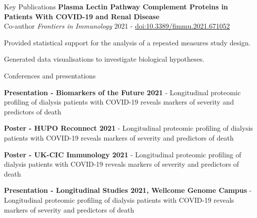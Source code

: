 \documentclass{resume}
\begin{document}
\begin{rSection}{Key Publications}
\textbf{Plasma Lectin Pathway Complement Proteins in Patients With COVID-19 and Renal Disease} \\
Co-author \hfill  \textit{Frontiers in Immunology} 2021 - \href{https://doi.org/10.3389/fimmu.2021.671052}{doi:10.3389/fimmu.2021.671052}

\vspace{2pt plus 1pt minus 1pt}
\item Provided statistical support for the analysis of a repeated measures study design.
\item Generated data visualisations to investigate biological hypotheses. \\

\end{rSection}

\begin{rSection}{Conferences and presentations}

\item \textbf{Presentation - Biomarkers of the Future 2021} - Longitudinal proteomic profiling of dialysis patients with COVID-19 reveals markers of severity and predictors of death
\vspace{2pt plus 1pt minus 1pt}

\item \textbf{Poster - HUPO Reconnect 2021} - Longitudinal proteomic profiling of dialysis patients with COVID-19 reveals markers of severity and predictors of death
\vspace{2pt plus 1pt minus 1pt}

\item \textbf{Poster - UK-CIC Immunology 2021} - Longitudinal proteomic profiling of dialysis patients with COVID-19 reveals markers of severity and predictors of death
\vspace{2pt plus 1pt minus 1pt}

\item \textbf{Presentation - Longitudinal Studies 2021, Wellcome Genome Campus} - Longitudinal proteomic profiling of dialysis patients with COVID-19 reveals markers of severity and predictors of death
\vspace{2pt plus 1pt minus 1pt}

\end{rSection}
\end{document}
